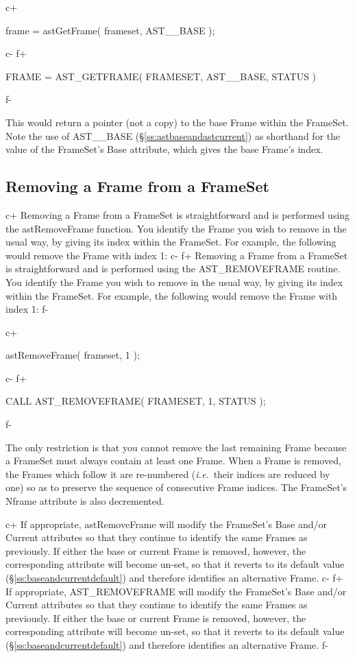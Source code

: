 \documentclass[twoside,11pt]{starlink}
\providecommand{\secref}[1]{\S\ref{#1}}
\begin{document}
{c+
\small
\begin{terminalv}
frame = astGetFrame( frameset, AST__BASE );
\end{terminalv}
\normalsize
c-
f+
\small
\begin{terminalv}
      FRAME = AST_GETFRAME( FRAMESET, AST__BASE, STATUS )
\end{terminalv}
\normalsize
f-

This would return a pointer (not a copy) to the base Frame within the
FrameSet. Note the use of AST\_\_BASE
(\secref{ss:astbaseandastcurrent}) as shorthand for the value of the
FrameSet's Base attribute, which gives the base Frame's index.

\subsection{Removing a Frame from a FrameSet}

c+
Removing a Frame from a FrameSet is straightforward and is performed
using the astRemoveFrame function. You identify the Frame you wish to
remove in the usual way, by giving its index within the FrameSet. For
example, the following would remove the Frame with index 1:
c-
f+
Removing a Frame from a FrameSet is straightforward and is performed
using the AST\_REMOVEFRAME routine. You identify the Frame you wish to
remove in the usual way, by giving its index within the FrameSet. For
example, the following would remove the Frame with index 1:
f-

c+
\small
\begin{terminalv}
astRemoveFrame( frameset, 1 );
\end{terminalv}
\normalsize
c-
f+
\small
\begin{terminalv}
      CALL AST_REMOVEFRAME( FRAMESET, 1, STATUS );
\end{terminalv}
\normalsize
f-

The only restriction is that you cannot remove the last remaining
Frame because a FrameSet must always contain at least one Frame.  When
a Frame is removed, the Frames which follow it are re-numbered
(\emph{i.e.}\ their indices are reduced by one) so as to preserve the
sequence of consecutive Frame indices.  The FrameSet's Nframe
attribute is also decremented.

c+
If appropriate, astRemoveFrame will modify the FrameSet's Base and/or
Current attributes so that they continue to identify the same Frames
as previously. If either the base or current Frame is removed,
however, the corresponding attribute will become un-set, so that it
reverts to its default value (\secref{ss:baseandcurrentdefault}) and
therefore identifies an alternative Frame.
c-
f+
If appropriate, AST\_REMOVEFRAME will modify the FrameSet's Base
and/or Current attributes so that they continue to identify the same
Frames as previously. If either the base or current Frame is removed,
however, the corresponding attribute will become un-set, so that it
reverts to its default value (\secref{ss:baseandcurrentdefault}) and
therefore identifies an alternative Frame.
f-

}
\end{document}
